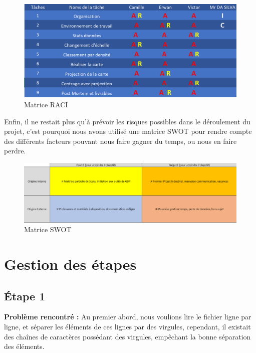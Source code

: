 \documentclass{article}
\begin{document}
\begin{figure}[H]
    \centering
    \includegraphics[scale=0.4]{raci.png}
    \caption{Matrice RACI}
    \label{fig:raci}
\end{figure}

Enfin, il ne restait plus qu’à prévoir les risques possibles dans le déroulement du projet, c’est pourquoi nous avons utilisé une matrice SWOT pour rendre compte des différents facteurs pouvant nous faire gagner du temps, ou nous en faire perdre.

\vspace{1\baselineskip}

\begin{figure}[H]
    \centering
    \includegraphics[scale=0.5]{swot.png}
    \caption{Matrice SWOT}
    \label{fig:swot}
\end{figure}

\vspace{3\baselineskip}

\section{ Gestion des étapes}


\subsection{ Étape 1} 


\textbf{Problème rencontré :} \newline
Au premier abord, nous voulions lire le fichier ligne par ligne, et séparer les éléments de ces lignes par des virgules, cependant, il existait des chaînes de caractères possédant des virgules, empêchant la bonne séparation des éléments.
\end{document}
